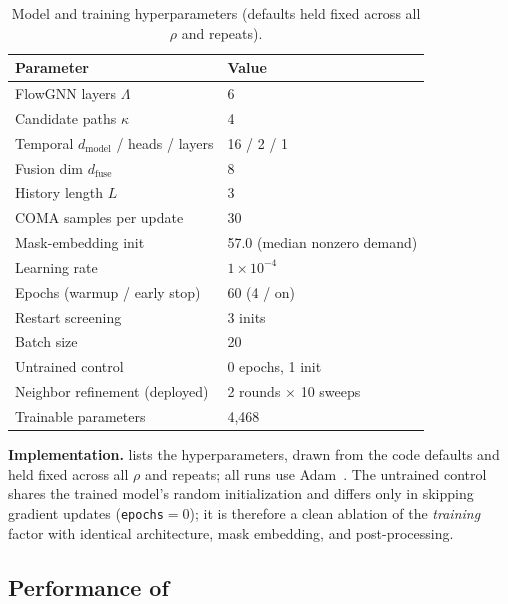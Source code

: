\begin{table}[t]
    \caption{Model and training hyperparameters (defaults held fixed
    across all $\rho$ and repeats).}
    \label{tab:hparams}
    \centering
    \footnotesize
    \setlength{\tabcolsep}{4pt}
    \begin{tabular}{@{}ll@{}}
        \toprule
        Parameter & Value \\
        \midrule
        FlowGNN layers $\Lambda$ & 6 \\
        Candidate paths $\kappa$ & 4 \\
        Temporal $d_{\mathrm{model}}$ / heads / layers & 16 / 2 / 1 \\
        Fusion dim $d_{\mathrm{fuse}}$ & 8 \\
        History length $L$ & 3 \\
        COMA samples per update & 30 \\
        Mask-embedding init & 57.0 (median nonzero demand) \\
        \midrule
        Learning rate & $1\!\times\!10^{-4}$ \\
        Epochs (warmup / early stop) & 60 (4 / on) \\
        Restart screening & 3 inits \\
        Batch size & 20 \\
        Untrained control & 0 epochs, 1 init \\
        Neighbor refinement (deployed) & 2 rounds $\times$ 10 sweeps \\
        \midrule
        Trainable parameters & 4{,}468 \\
        \bottomrule
    \end{tabular}
\end{table}

\textbf{Implementation.}  lists the
hyperparameters, drawn from the code defaults and held fixed across all
$\rho$ and repeats; all runs use Adam~\cite{kingma2015}. The untrained control
shares the trained model's
random initialization and differs only in skipping gradient updates
(\texttt{epochs${=}0$}); it is therefore a clean ablation of the
\emph{training} factor with identical architecture, mask embedding, and
post-processing.

\subsection{Performance of \sysname{}}
\label{sec:own-results}

